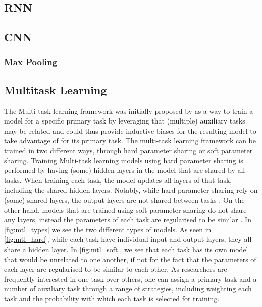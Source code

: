 \subsection{RNN}

\subsection{CNN}

\subsubsection{Max Pooling}

\subsection{Multitask Learning}
%
The Multi-task learning framework was initially proposed by \citet{Caruana:1997} as a way to train a model for a specific primary task by leveraging that (multiple) auxiliary tasks may be related and could thus provide inductive biases for the resulting model to take advantage of for its primary task. The multi-task learning framework can be trained in two different ways, through hard parameter sharing or soft parameter sharing. Training Multi-task learning models using hard parameter sharing is performed by having (some) hidden layers in the model that are shared by all tasks. When training each task, the model updates all layers of that task, including the shared hidden layers. Notably, while hard parameter sharing rely on (some) shared layers, the output layers are not shared between tasks \cite{CITE: Hard parameter sharing paper}. On the other hand, models that are trained using soft parameter sharing do not share any layers, instead the parameters of each task are regularised to be similar \cite{CITE: Soft parameter sharing paper - See Sebastian Ruder's blogpost on MTL for reference}. In \autoref{fig:mtl_types} we see the two different types of models. As seen in \autoref{fig:mtl_hard}, while each task have individual input and output layers, they all share a hidden layer. In \autoref{fig:mtl_soft}, we see that each task has its own model that would be unrelated to one another, if not for the fact that the parameters of each layer are regularised to be similar to each other. As researchers are frequently interested in one task over others, one can assign a primary task and a number of auxiliary task through a range of strategies, including weighting each task and the probability with which each task is selected for training.

